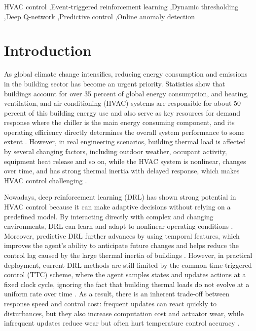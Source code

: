\documentclass[preprint,12pt,number]{elsarticle}
\begin{document}
\begin{frontmatter}
\begin{keyword}
HVAC control \sep Event-triggered reinforcement learning \sep Dynamic thresholding \sep Deep Q-network \sep Predictive control \sep Online anomaly detection
\end{keyword}

\end{frontmatter}


\section{Introduction}\label{introduction}

As global climate change intensifies, reducing energy consumption and emissions in the building sector has become an urgent priority. Statistics show that buildings account for over 35 percent of global energy consumption, and heating, ventilation, and air conditioning (HVAC) systems are responsible for about 50 percent of this building energy use and also serve as key resources for demand response where the chiller is the main energy consuming component, and its operating efficiency directly determines the overall system performance to some extent \cite{ref1}. However, in real engineering scenarios, building thermal load is affected by several changing factors, including outdoor weather, occupant activity, equipment heat release and so on, while the HVAC system is nonlinear, changes over time, and has strong thermal inertia with delayed response, which makes HVAC control challenging \cite{ref2}.

Nowadays, deep reinforcement learning (DRL) has shown strong potential in HVAC control because it can make adaptive decisions without relying on a predefined model. By interacting directly with complex and changing environments, DRL can learn and adapt to nonlinear operating conditions \cite{ref3}. Moreover, predictive DRL further advances by using temporal features, which improves the agent's ability to anticipate future changes and helps reduce the control lag caused by the large thermal inertia of buildings \cite{ref4}. However, in practical deployment, current DRL methods are still limited by the common time-triggered control (TTC) scheme, where the agent samples states and updates actions at a fixed clock cycle, ignoring the fact that building thermal loads do not evolve at a uniform rate over time \cite{ref5}. As a result, there is an inherent trade-off between response speed and control cost: frequent updates can react quickly to disturbances, but they also increase computation cost and actuator wear, while infrequent updates reduce wear but often hurt temperature control accuracy \cite{ref6}.
\end{document}
